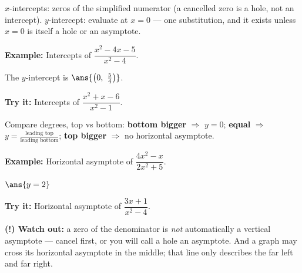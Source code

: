 \documentclass[12pt]{article}
\begin{document}

\begin{formulabox}
$x$-intercepts: zeros of the simplified numerator (a cancelled zero is a hole,
not an intercept). $y$-intercept: evaluate at $x = 0$ --- one substitution, and
it exists unless $x = 0$ is itself a hole or an asymptote.
\end{formulabox}

\begin{examplebox}
\textbf{Example:} \quad Intercepts of $\dfrac{x^2-4x-5}{x^2-4}$.

The $y$-intercept is $\ans{\left(0,\ \tfrac{5}{4}\right)}$.
\end{examplebox}

\begin{tryitbox}
\textbf{Try it:} \quad Intercepts of $\dfrac{x^2+x-6}{x^2-1}$.\\[2pt]
\end{tryitbox}


\begin{formulabox}
Compare degrees, top vs bottom: \textbf{bottom bigger} $\Rightarrow$ $y = 0$;
\textbf{equal} $\Rightarrow$ $y = \frac{\text{leading top}}{\text{leading
bottom}}$; \textbf{top bigger} $\Rightarrow$ no horizontal asymptote.
\end{formulabox}

\begin{examplebox}
\textbf{Example:} \quad Horizontal asymptote of $\dfrac{4x^2-x}{2x^2+5}$.

$\ans{y = 2}$
\end{examplebox}

\begin{tryitbox}
\textbf{Try it:} \quad Horizontal asymptote of $\dfrac{3x+1}{x^2-4}$.\\[2pt]
\end{tryitbox}

\begin{watchoutbox}
\textbf{(!) Watch out:} a zero of the denominator is \emph{not} automatically a
vertical asymptote --- cancel first, or you will call a hole an asymptote. And
a graph may cross its horizontal asymptote in the middle; that line only
describes the far left and far right.
\end{watchoutbox}
\end{document}
